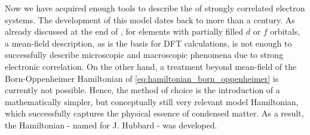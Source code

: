 \documentclass[\main/main.tex]{subfiles}
\begin{document}
Now we have acquired enough tools to describe the  of strongly correlated electron systems. The development of this model dates back to more than a century. As already discussed at the end of , for elements with partially filled $d$ or $f$ orbitals, a mean-field description, as is the basis for DFT calculations, is not enough to successfully describe microscopic and macroscopic phenomena due to strong electronic correlation. On the other hand, a treatment beyond mean-field of the Born-Oppenheimer Hamiltonian of \eqref{eq:hamiltonian_born_oppenheimer} is currently not possible. Hence, the method of choice is the introduction of a mathematically simpler, but conceptually still very relevant model Hamiltonian, which successfully captures the physical essence of condensed matter. As a result, the Hamiltonian - named for J. Hubbard - was developed.
\end{document}
